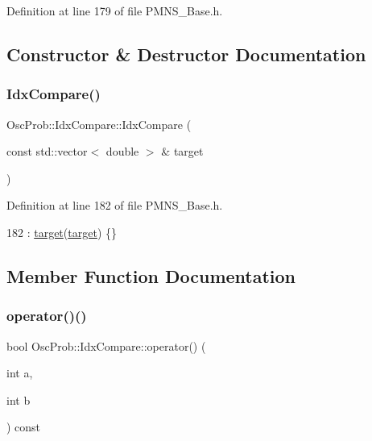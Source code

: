 Definition at line 179 of file P\+M\+N\+S\+\_\+\+Base.\+h.



\subsection{Constructor \& Destructor Documentation}
\mbox{\label{structOscProb_1_1IdxCompare_af1c43639da52d0c66e587c7432582cb5}} 
\subsubsection{\texorpdfstring{Idx\+Compare()}{IdxCompare()}}
{\footnotesize\ttfamily Osc\+Prob\+::\+Idx\+Compare\+::\+Idx\+Compare (\begin{DoxyParamCaption}\item[{const std\+::vector$<$ double $>$ \&}]{target }\end{DoxyParamCaption})\hspace{0.3cm}{\ttfamily [inline]}}



Definition at line 182 of file P\+M\+N\+S\+\_\+\+Base.\+h.


\begin{DoxyCode}
182 : \hyperlink{structOscProb_1_1IdxCompare_ab3258085f0afeb64bf472413bfed43ac}{target}(\hyperlink{structOscProb_1_1IdxCompare_ab3258085f0afeb64bf472413bfed43ac}{target}) \{\}
\end{DoxyCode}


\subsection{Member Function Documentation}
\mbox{\label{structOscProb_1_1IdxCompare_ac4c6fc547109b3e0007d6342eea57dff}} 
\subsubsection{\texorpdfstring{operator()()}{operator()()}}
{\footnotesize\ttfamily bool Osc\+Prob\+::\+Idx\+Compare\+::operator() (\begin{DoxyParamCaption}\item[{int}]{a,  }\item[{int}]{b }\end{DoxyParamCaption}) const\hspace{0.3cm}{\ttfamily [inline]}}



